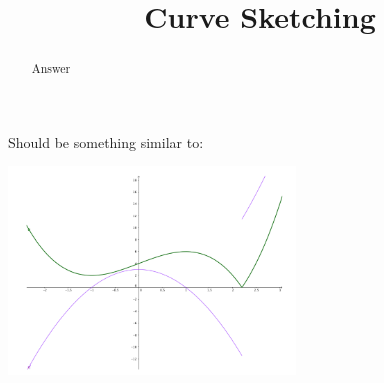 \documentclass[handout]{ximera}
\title{Curve Sketching}
\begin{document}
\begin{abstract} Answer %
\end{abstract}

\maketitle

Should be something similar to:

\includegraphics[width=3in]{graph2.png}
\end{document}
